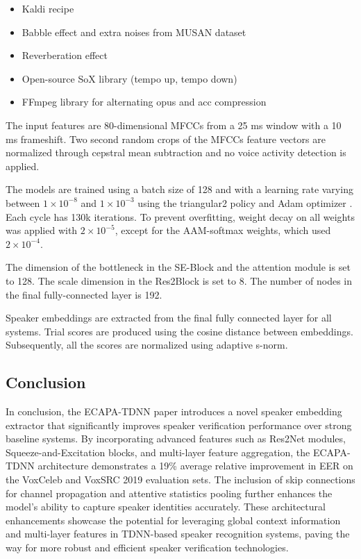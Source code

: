 \begin{itemize}
    \item Kaldi recipe \cite{snyder2019}
    \item Babble effect and extra noises from MUSAN dataset \cite{musan}
    \item Reverberation effect
    \item Open-source SoX library (tempo up, tempo down)
    \item FFmpeg library for alternating opus and acc compression
\end{itemize}

The input features are 80-dimensional MFCCs from a 25 ms window with a 10 ms frameshift. Two second random crops of the MFCCs feature vectors are normalized through cepstral mean subtraction and no voice activity detection is applied.

The models are trained using a batch size of 128 and with a learning rate varying between $1 \times 10^{-8}$ and $1 \times 10^{-3}$ using the triangular2 policy and Adam optimizer \cite{kingma2017adam}. Each cycle has 130k iterations. To prevent overfitting, weight decay on all weights was applied with $2 \times 10^{-5}$, except for the AAM-softmax weights, which used $2 \times 10^{-4}$.

The dimension of the bottleneck in the SE-Block and the attention module is set to 128. The scale dimension in the Res2Block is set to 8. The number of nodes in the final fully-connected layer is 192.

Speaker embeddings are extracted from the final fully connected layer for all systems. Trial scores are produced using the cosine distance between embeddings. Subsequently, all the scores are normalized using adaptive s-norm.

\subsection{Conclusion}
In conclusion, the ECAPA-TDNN paper introduces a novel speaker embedding extractor that significantly improves speaker verification performance over strong baseline systems. By incorporating advanced features such as Res2Net modules, Squeeze-and-Excitation blocks, and multi-layer feature aggregation, the ECAPA-TDNN architecture demonstrates a 19\% average relative improvement in EER on the VoxCeleb and VoxSRC 2019 evaluation sets. The inclusion of skip connections for channel propagation and attentive statistics pooling further enhances the model's ability to capture speaker identities accurately. These architectural enhancements showcase the potential for leveraging global context information and multi-layer features in TDNN-based speaker recognition systems, paving the way for more robust and efficient speaker verification technologies.

